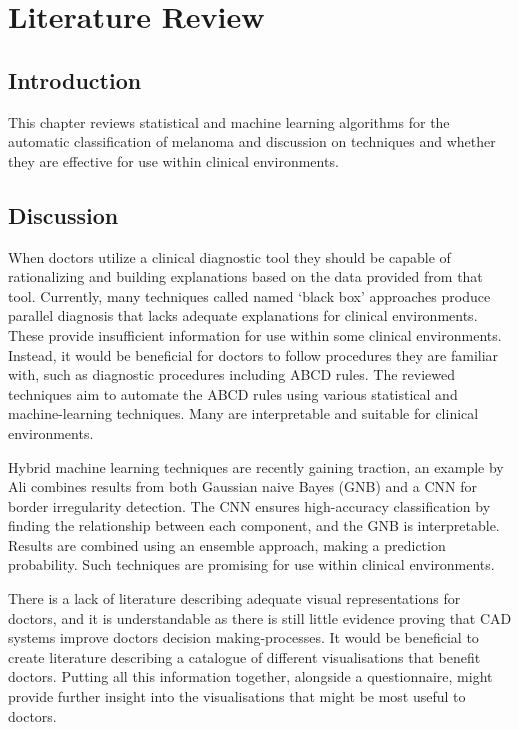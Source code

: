 \cleardoublepage
\chapter{Literature Review}

\section{Introduction}
This chapter reviews statistical and machine learning algorithms for the automatic classification of melanoma and discussion on techniques and whether they are effective for use within clinical environments.


\section{Discussion}

When doctors utilize a clinical diagnostic tool they should be capable of rationalizing and building explanations based on the data provided from that tool. Currently, many techniques\cite{Andre2017} called named `black box' approaches produce parallel diagnosis that lacks adequate explanations for clinical environments. These provide insufficient information for use within some clinical environments\cite{Andre2017}. Instead, it would be beneficial for doctors to follow procedures they are familiar with, such as diagnostic procedures including ABCD rules. The reviewed techniques aim to automate the ABCD rules using various statistical and machine-learning techniques. Many are interpretable and suitable for clinical environments.

Hybrid machine learning techniques are recently gaining traction, an example by Ali combines results from both Gaussian naive Bayes (GNB) and a CNN\cite{Ali2020b} for border irregularity detection. The CNN ensures high-accuracy classification by finding the relationship between each component, and the GNB is interpretable. Results are combined using an ensemble approach, making a prediction probability. Such techniques are promising for use within clinical environments.

There is a lack of literature describing adequate visual representations for doctors, and it is understandable as there is still little evidence proving that CAD systems improve doctors decision making-processes\cite{FerrantediRuffano2018}. It would be beneficial to create literature describing a catalogue of different visualisations that benefit doctors. Putting all this information together, alongside a questionnaire, might provide further insight into the visualisations that might be most useful to doctors.

